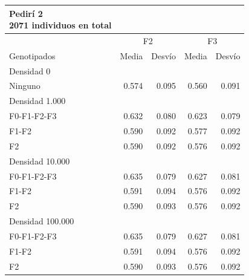 \documentclass[11pt,spanish,a4paper,oneside,]{book} %
\begin{document}
\begin{longtable}{lrrrr}
\caption*{
{\large Pedirí 2} \\ 
{\small 2071 individuos en total}
} \\ 
\toprule
 & \multicolumn{2}{c}{F2} & \multicolumn{2}{c}{F3} \\ 
 \cmidrule(lr){2-3} \cmidrule(lr){4-5}
Genotipados & Media & Desvío & Media & Desvío \\ 
\midrule
\multicolumn{1}{l}{Densidad 0} \\ 
\midrule
Ninguno & 0.574 & 0.095 & 0.560 & 0.091 \\ 
\midrule
\multicolumn{1}{l}{Densidad 1.000} \\ 
\midrule
F0-F1-F2-F3 & 0.632 & 0.080 & 0.623 & 0.079 \\ 
F1-F2 & 0.590 & 0.092 & 0.577 & 0.092 \\ 
F2 & 0.590 & 0.092 & 0.576 & 0.092 \\ 
\midrule
\multicolumn{1}{l}{Densidad 10.000} \\ 
\midrule
F0-F1-F2-F3 & 0.635 & 0.079 & 0.627 & 0.081 \\ 
F1-F2 & 0.591 & 0.094 & 0.576 & 0.092 \\ 
F2 & 0.590 & 0.093 & 0.576 & 0.092 \\ 
\midrule
\multicolumn{1}{l}{Densidad 100.000} \\ 
\midrule
F0-F1-F2-F3 & 0.635 & 0.079 & 0.627 & 0.081 \\ 
F1-F2 & 0.591 & 0.094 & 0.576 & 0.092 \\ 
F2 & 0.590 & 0.093 & 0.576 & 0.092 \\ 
 \bottomrule
\end{longtable}
\captionsetup[table]{labelformat=empty,skip=1pt}
\end{document}
